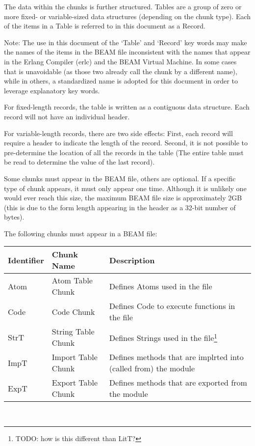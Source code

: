 \documentclass{article}
\begin{document}
The data within the chunks is further structured.  Tables are a group
of zero or more fixed- or variable-sized data structures (depending
on the chunk type).  Each of the items in a Table is referred to 
in this document as a Record.  

Note: The use in this document of the `Table' and `Record' key words
may make the names of the items in the BEAM file inconsistent with
the names that appear in the Erlang Compiler (erlc)
and the BEAM Virtual Machine.  In some cases that is unavoidable (as those 
two already call the chunk by a different name), while in others, a
standardized name is adopted for this document in order to leverage
explanatory key words.

For fixed-length records, the table is written as a contiguous data 
structure.  Each record will not have an individual header.

For variable-length records, there are two side effects: First, each
record will require a header to indicate the length of the record. 
Second, it is not possible to pre-determine the location of all the
records in the table (The entire table must be read to determine the
value of the last record).

Some chunks must appear in the BEAM file, others are optional.
If a specific type of chunk appears, it must only appear one time.
Although it is unlikely one would ever reach this size, 
the maximum BEAM file size is approximately 2GB (this is due
to the form length appearing in the header as a 32-bit number of bytes).

The following chunks must appear in a BEAM file:\\
\begin{savenotes}
\begin{tabular}{ |l|l|p{3.5in}| } \hline
Identifier & Chunk Name         & Description \\ \hline
Atom       & Atom Table Chunk   & Defines Atoms used in the file \\ \hline
Code       & Code Chunk         & Defines Code to execute functions in the file \\ \hline
StrT       & String Table Chunk & Defines Strings used in the file\footnote{TODO: how is this different than LitT?} \\ \hline
ImpT       & Import Table Chunk & Defines methods that are implrted into (called from) the module \\ \hline
ExpT       & Export Table Chunk & Defines methods that are exported from the module \\ \hline
\end{tabular}\\
\end{savenotes}
\end{document}
